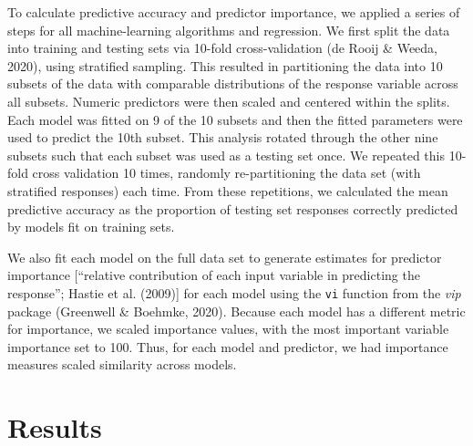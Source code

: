 \documentclass[
  english,
  ,pub,floatsintext]{apa6}
\begin{document}
To calculate predictive accuracy and predictor importance, we applied a series of steps for all machine-learning algorithms and regression. We first split the data into training and testing sets via 10-fold cross-validation (de Rooij \& Weeda, 2020), using stratified sampling. This resulted in partitioning the data into 10 subsets of the data with comparable distributions of the response variable across all subsets. Numeric predictors were then scaled and centered within the splits. Each model was fitted on 9 of the 10 subsets and then the fitted parameters were used to predict the 10th subset. This analysis rotated through the other nine subsets such that each subset was used as a testing set once. We repeated this 10-fold cross validation 10 times, randomly re-partitioning the data set (with stratified responses) each time. From these repetitions, we calculated the mean predictive accuracy as the proportion of testing set responses correctly predicted by models fit on training sets.

We also fit each model on the full data set to generate estimates for predictor importance {[}``relative contribution of each input variable in predicting the response''; Hastie et al. (2009){]} for each model using the \texttt{vi} function from the \emph{vip} package (Greenwell \& Boehmke, 2020). Because each model has a different metric for importance, we scaled importance values, with the most important variable importance set to 100. Thus, for each model and predictor, we had importance measures scaled similarity across models.

\hypertarget{results}{%
\section{Results}\label{results}}
\end{document}
